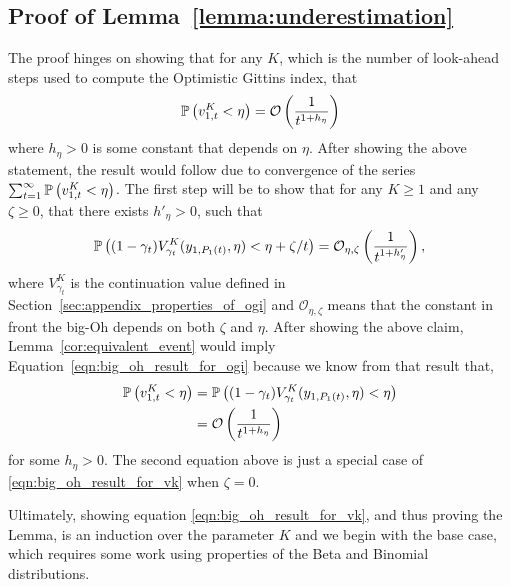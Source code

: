 \subsection{Proof of Lemma~\ref{lemma:underestimation}} \label{proof:underestimation_proof}
\begin{myproof}[Proof.]
	The proof hinges on showing that for any $K$, which is the number of look-ahead steps used to compute the Optimistic Gittins index, that
	\begin{equation} \label{eqn:big_oh_result_for_ogi}
	\P{v^K_{1,t} < \eta} = \mathcal{O}\left(\frac{1}{t^{1 + h_\eta}}\right)
	\end{equation}
	where $h_\eta > 0$ is some constant that depends on $\eta$. After showing the above statement, the result would follow due to convergence of the series $\sum_{t=1}^\infty \P{v^K_{1,t} < \eta}$. The first step will be to show that for any $K \ge 1$ and any $\zeta \ge 0$, that there exists $h'_\eta > 0$, such that
	\begin{equation} \label{eqn:big_oh_result_for_vk}
		\P{(1-\gamma_t)V^K_{\gamma_t}(y_{1,\Nt{1}}, \eta) < \eta + \zeta/t} = \mathcal{O}_{\eta,\zeta}\left(\frac{1}{t^{1 + h'_\eta}}\right),
	\end{equation}
	where $V^K_{\gamma_t}$ is the continuation value defined in Section~\ref{sec:appendix_properties_of_ogi} and $\mathcal{O}_{\eta,\zeta}$ means that the constant in front the big-Oh depends on both $\zeta$ and $\eta$. After showing the above claim, Lemma~\ref{cor:equivalent_event} would imply Equation~\eqref{eqn:big_oh_result_for_ogi} because we know from that result that,
	\begin{align*}
		\P{v^K_{1,t} < \eta} & = \P{(1-\gamma_t)V^K_{\gamma_t}(y_{1,\Nt{1}}, \eta) < \eta} \\
		& = \mathcal{O}\left(\frac{1}{t^{1 + h_\eta}}\right)
	\end{align*}
	for some $h_\eta > 0$. The second equation above is just a special case of \eqref{eqn:big_oh_result_for_vk} when $\zeta = 0$.
	
	Ultimately, showing equation \eqref{eqn:big_oh_result_for_vk}, and thus proving the Lemma, is an induction over the parameter $K$ and we begin with the base case, which requires some work using properties of the Beta and Binomial distributions.

\end{myproof}
